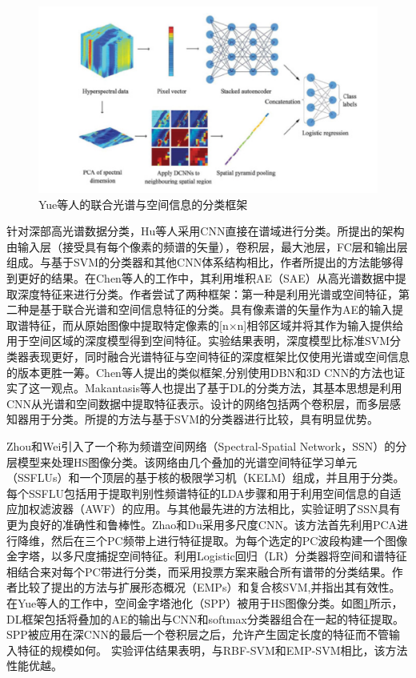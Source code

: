 \begin{figure}[tb]
\begin{center}
\includegraphics[width=0.9\linewidth]{figures/Yue.png} 
\end{center} 
\vspace{-4mm}
\caption{Yue等人的联合光谱与空间信息的分类框架} 
\label{fig_Yue}
\end{figure}


针对深部高光谱数据分类，Hu等人\cite{Hu2015Deep}采用CNN直接在谱域进行分类。所提出的架构由输入层（接受具有每个像素的频谱的矢量），卷积层，最大池层，FC层和输出层组成。与基于SVM的分类器和其他CNN体系结构相比，作者所提出的方法能够得到更好的结果。在Chen等人\cite{Chen2017Deep}的工作中，其利用堆积AE（SAE）从高光谱数据中提取深度特征来进行分类。作者尝试了两种框架：第一种是利用光谱或空间特征，第二种是基于联合光谱和空间信息特征的分类。具有像素谱的矢量作为AE的输入提取谱特征，而从原始图像中提取特定像素的[n×n]相邻区域并将其作为输入提供给用于空间区域的深度模型得到空间特征。实验结果表明，深度模型比标准SVM分类器表现更好，同时融合光谱特征与空间特征的深度框架比仅使用光谱或空间信息的版本更胜一筹。Chen等人\cite{Chen2015Spectral, Chen2016Deep}提出的类似框架,分别使用DBN和3D CNN的方法也证实了这一观点。Makantasis等人\cite{Makantasis2015Deep}也提出了基于DL的分类方法，其基本思想是利用CNN从光谱和空间数据中提取特征表示。设计的网络包括两个卷积层，而多层感知器用于分类。所提的方法与基于SVM的分类器进行比较，具有明显优势。

Zhou和Wei\cite{Zhou2016Learning}引入了一个称为频谱空间网络（Spectral-Spatial Network，SSN）的分层模型来处理HS图像分类。该网络由几个叠加的光谱空间特征学习单元（SSFLUs）和一个顶层的基于核的极限学习机（KELM）\cite{Huang2012Extreme}组成，并且用于分类。每个SSFLU包括用于提取判别性频谱特征的LDA步骤和用于利用空间信息的自适应加权滤波器（AWF）的应用。与其他最先进的方法相比，实验证明了SSN具有更为良好的准确性和鲁棒性。Zhao和Du\cite{Zhao2016Learning}采用多尺度CNN。该方法首先利用PCA进行降维，然后在三个PC频带上进行特征提取。为每个选定的PC波段构建一个图像金字塔，以多尺度捕捉空间特征。利用Logistic回归（LR）分类器将空间和谱特征相结合来对每个PC带进行分类，而采用投票方案来融合所有谱带的分类结果。作者比较了提出的方法与扩展形态概况（EMPs）\cite{Benediktsson2005Classification}和复合核SVM\cite{Fauvel2012A},并指出其有效性。在Yue等人\cite{Yue2016A}的工作中，空间金字塔池化（SPP）被用于HS图像分类。如图\ref{fig_Yue}所示，DL框架包括将叠加的AE的输出与CNN和softmax分类器组合在一起的特征提取。SPP被应用在深CNN的最后一个卷积层之后，允许产生固定长度的特征而不管输入特征的规模如何。 实验评估结果表明，与RBF-SVM和EMP-SVM相比，该方法性能优越。

